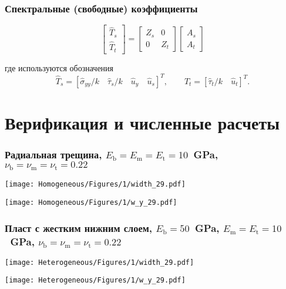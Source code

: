 \begin{frame}
    \frametitle{Спектральные (свободные) коэффициенты}
    \begin{equation}
        \label{eq:fourier_solution}
        \left[
        \begin{array}{c}
            \hat{T}_s \\
            \hat{T}_t 
        \end{array}
        \right]
        =
        \left[
        \begin{array}{cc}
            Z_s & 0 \\
            0 & Z_t 
        \end{array}
        \right]
        \left[
        \begin{array}{c}
            A_s \\
            A_t 
        \end{array}
        \right]
    \end{equation}
    
    где используются обозначения
    \begin{equation}
        \label{eq:FourierSeparateT}
        \hat{T}_s = \left[\hat{\sigma}_{yy}/k \quad \hat{\tau}_s/k \quad \hat{u}_y \quad \hat{u}_s \right]^T, \qquad 
        \hat{T}_t = \left[ \hat{\tau}_t/k \quad  \hat{u}_t \right]^T.
    \end{equation}
\end{frame}


\section{Верификация и численные расчеты}
\begin{frame}
    \frametitle{Радиальная трещина, $E_\text{b} = E_\text{m} = E_\text{t} = 10$~GPa, $\nu_\text{b} = \nu_\text{m} = \nu_\text{t} = 0.22$}
    \begin{minipage}[t]{0.4\linewidth}
        \texttt{[image: Homogeneous/Figures/1/width\_29.pdf]}
    \end{minipage}
    \hfill
    \begin{minipage}[t]{0.57\linewidth}
        \texttt{[image: Homogeneous/Figures/1/w\_y\_29.pdf]}
    \end{minipage}
\end{frame}

\begin{frame}
    \frametitle{Пласт с жестким нижним слоем, $E_\text{b} = 50$~GPa, $E_\text{m} = E_\text{t} = 10$~GPa, $\nu_\text{b} = \nu_\text{m} = \nu_\text{t} = 0.22$}
    \begin{minipage}[t]{0.4\linewidth}
        \texttt{[image: Heterogeneous/Figures/1/width\_29.pdf]}
    \end{minipage}
    \hfill
    \begin{minipage}[t]{0.57\linewidth}
        \texttt{[image: Heterogeneous/Figures/1/w\_y\_29.pdf]}
    \end{minipage}
\end{frame}


